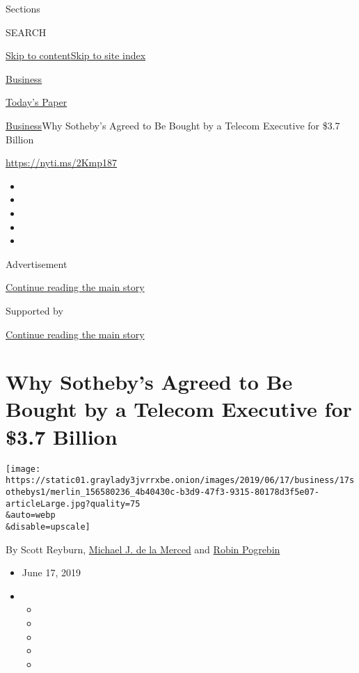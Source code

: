 Sections

SEARCH

\protect\hyperlink{site-content}{Skip to
content}\protect\hyperlink{site-index}{Skip to site index}

\href{https://www.nytimes3xbfgragh.onion/section/business}{Business}

\href{https://myaccount.nytimes3xbfgragh.onion/auth/login?response_type=cookie\&client_id=vi}{}

\href{https://www.nytimes3xbfgragh.onion/section/todayspaper}{Today's
Paper}

\href{/section/business}{Business}\textbar{}Why Sotheby's Agreed to Be
Bought by a Telecom Executive for \$3.7 Billion

\url{https://nyti.ms/2Kmp187}

\begin{itemize}
\item
\item
\item
\item
\item
\end{itemize}

Advertisement

\protect\hyperlink{after-top}{Continue reading the main story}

Supported by

\protect\hyperlink{after-sponsor}{Continue reading the main story}

\hypertarget{why-sothebys-agreed-to-be-bought-by-a-telecom-executive-for-37-billion}{%
\section{Why Sotheby's Agreed to Be Bought by a Telecom Executive for
\$3.7
Billion}\label{why-sothebys-agreed-to-be-bought-by-a-telecom-executive-for-37-billion}}

\texttt{[image: https://static01.graylady3jvrrxbe.onion/images/2019/06/17/business/17sothebys1/merlin\_156580236\_4b40430c-b3d9-47f3-9315-80178d3f5e07-articleLarge.jpg?quality=75\\\&auto=webp\\\&disable=upscale]}

By Scott Reyburn,
\href{https://www.nytimes3xbfgragh.onion/by/michael-j-de-la-merced}{Michael
J. de la Merced} and
\href{https://www.nytimes3xbfgragh.onion/by/robin-pogrebin}{Robin
Pogrebin}

\begin{itemize}
\item
  June 17, 2019
\item
  \begin{itemize}
  \item
  \item
  \item
  \item
  \item
  \end{itemize}
\end{itemize}


